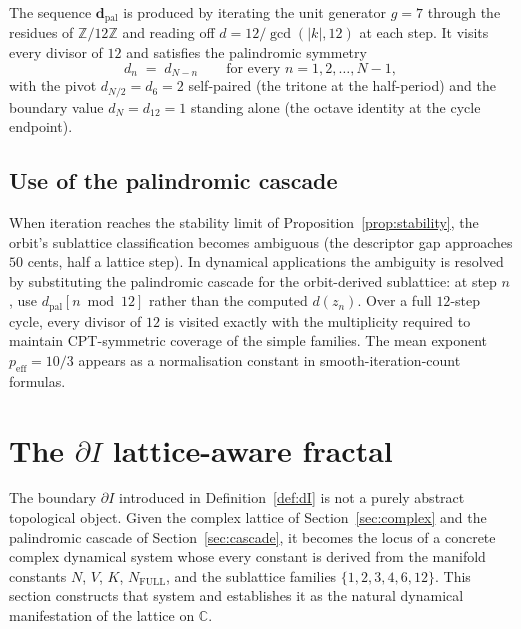 \documentclass[11pt,a4paper]{article}
\theoremstyle{definition}
\theoremstyle{remark}
\newcommand{\Z}{\mathbb{Z}}
\newcommand{\C}{\mathbb{C}}
\begin{document}
The sequence $\mathbf{d}_{\mathrm{pal}}$ is produced by iterating the unit generator $g=7$ through the residues of $\Z/12\Z$ and reading off $d = 12/\gcd(|k|,12)$ at each step. It visits every divisor of $12$ and satisfies the palindromic symmetry
\begin{equation}\label{eq:palindrome}
d_{n} \;=\; d_{N-n} \qquad\text{for every } n = 1,2,\ldots,N-1,
\end{equation}
with the pivot $d_{N/2}=d_{6}=2$ self-paired (the tritone at the half-period) and the boundary value $d_{N}=d_{12}=1$ standing alone (the octave identity at the cycle endpoint).

\subsection{Use of the palindromic cascade}

When iteration reaches the stability limit of Proposition~\ref{prop:stability}, the orbit's sublattice classification becomes ambiguous (the descriptor gap approaches $50$ cents, half a lattice step). In dynamical applications the ambiguity is resolved by substituting the palindromic cascade for the orbit-derived sublattice: at step $n$, use $d_{\mathrm{pal}}[n\bmod 12]$ rather than the computed $d(z_{n})$. Over a full $12$-step cycle, every divisor of $12$ is visited exactly with the multiplicity required to maintain CPT-symmetric coverage of the simple families. The mean exponent $p_{\mathrm{eff}}=10/3$ appears as a normalisation constant in smooth-iteration-count formulas.

\section{The $\partial I$ lattice-aware fractal}\label{sec:fractal}

The boundary $\partial I$ introduced in Definition~\ref{def:dI} is not a purely abstract topological object. Given the complex lattice of Section~\ref{sec:complex} and the palindromic cascade of Section~\ref{sec:cascade}, it becomes the locus of a concrete complex dynamical system whose every constant is derived from the manifold constants $N$, $V$, $K$, $N_{\mathrm{FULL}}$, and the sublattice families $\{1,2,3,4,6,12\}$. This section constructs that system and establishes it as the natural dynamical manifestation of the lattice on $\C$.
\end{document}
